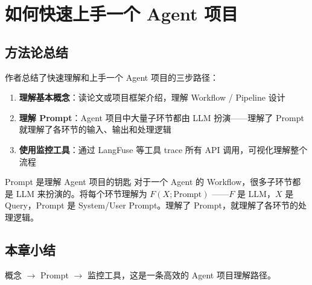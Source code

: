 \section{如何快速上手一个 Agent 项目}

\subsection{方法论总结}

作者总结了快速理解和上手一个 Agent 项目的三步路径：

\begin{enumerate}
    \item \textbf{理解基本概念}：读论文或项目框架介绍，理解 Workflow / Pipeline 设计
    \item \textbf{理解 Prompt}：Agent 项目中大量子环节都由 LLM 扮演——理解了 Prompt 就理解了各环节的输入、输出和处理逻辑
    \item \textbf{使用监控工具}：通过 LangFuse 等工具 trace 所有 API 调用，可视化理解整个流程
\end{enumerate}

\begin{knowledgebox}{Prompt 是理解 Agent 项目的钥匙}
对于一个 Agent 的 Workflow，很多子环节都是 LLM 来扮演的。将每个环节理解为 $F(X; \text{Prompt})$ ——$F$ 是 LLM，$X$ 是 Query，Prompt 是 System/User Prompt。理解了 Prompt，就理解了各环节的处理逻辑。
\end{knowledgebox}

\subsection{本章小结}

概念 $\rightarrow$ Prompt $\rightarrow$ 监控工具，这是一条高效的 Agent 项目理解路径。

